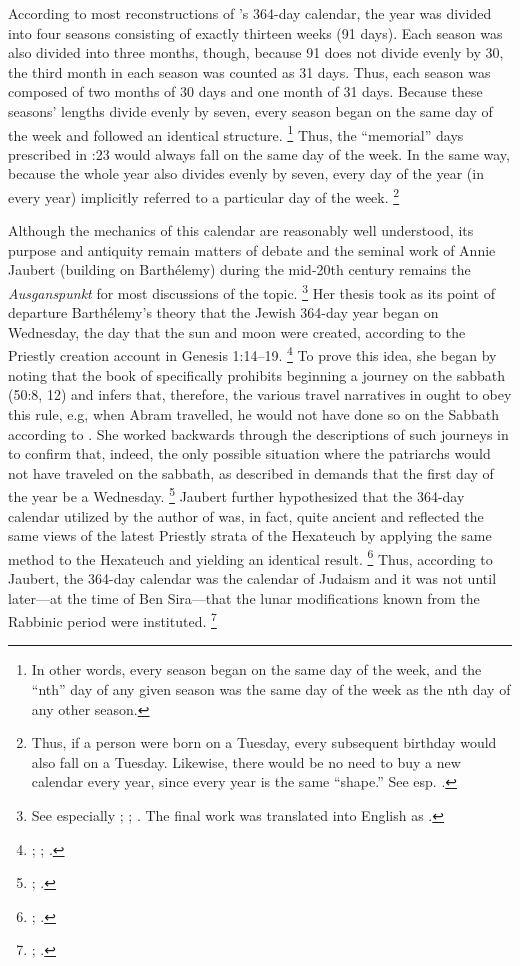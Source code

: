 According to most reconstructions of \jub's 364-day calendar, the year was divided into four seasons consisting of exactly thirteen weeks (91 days). Each season was also divided into three months, though, because 91 does not divide evenly by 30, the third month in each season was counted as 31 days. Thus, each season was composed of two months of 30 days and one month of 31 days. Because these seasons' lengths divide evenly by seven, every season began on the same day of the week and followed an identical structure.%
    \footnote{In other words, every season began on the same day of the week, and the ``nth'' day of any given season was the same day of the week as the nth day of any other season.}
Thus, the ``memorial'' days  prescribed in :23 would always fall on the same day of the week. In the same way, because the whole year also divides evenly by seven, every day of the year (in every year) implicitly referred to a particular day of the week.%
    \footnote{Thus, if a person were born on a Tuesday, every subsequent birthday would also fall on a Tuesday. Likewise, there would be no need to buy a new calendar every year, since every year is the same ``shape.'' See esp. \cite[253]{jaubert_vt1953}.}

Although the mechanics of this calendar are reasonably well understood, its purpose and antiquity remain matters of debate and the seminal work of Annie Jaubert (building on Barthélemy) during the mid-20th century remains the \emph{Ausganspunkt} for most discussions of the topic.%
    \footnote{See especially \cite{jaubert_vt1953}; \cite{jaubert_vt1957}; \cite{jaubert1957}. The final work was translated into English as \cite*{jaubert1965}.}
Her thesis took as its point of departure Barthélemy's theory that the Jewish 364-day year began on Wednesday, the day that the sun and moon were created, according to the Priestly creation account in Genesis 1:14--19.%
    \footnote{\cite{barthelemy_rb1952}; \cite[250]{jaubert_vt1953}; \cite[24--25]{jaubert1965}.}
To prove this idea, she began by noting that the book of \jub specifically prohibits beginning a journey on the sabbath (50:8, 12) and infers that, therefore, the various travel narratives in \jub ought to obey this rule, e.g, when Abram travelled, he would not have done so on the Sabbath according to \jub. She worked backwards through the descriptions of such journeys in \jub to confirm that, indeed, the only possible situation where the patriarchs would not have traveled on the sabbath, as described in \jub demands that the first day of the year be a Wednesday.%
    \footnote{\cite[252--254]{jaubert_vt1953}; \cite[25--27]{jaubert1965}.}
Jaubert further hypothesized that the 364-day calendar utilized by the author of \jub was, in fact, quite ancient and reflected the same views of the latest Priestly strata of the Hexateuch by applying the same method to the Hexateuch and yielding an identical result.%
    \footnote{\cite[258]{jaubert_vt1953}; \cite[33]{jaubert1965}.}
Thus, according to Jaubert, the 364-day calendar was the calendar of \secondtemple Judaism and it was not until later---at the time of Ben Sira---that the lunar modifications known from the Rabbinic period were instituted.%
    \footnote{\cite[254--258; 262--264]{jaubert_vt1953}; \cite[47--51]{jaubert1965}.}


